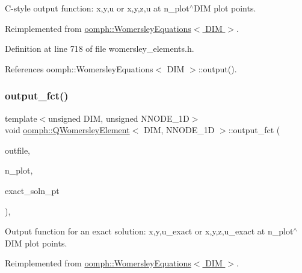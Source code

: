 C-\/style output function\+: x,y,u or x,y,z,u at n\+\_\+plot$^\wedge$\+D\+IM plot points. 



Reimplemented from \hyperlink{classoomph_1_1WomersleyEquations_ad5254560613d0c22280f15cc9cb42dc7}{oomph\+::\+Womersley\+Equations$<$ D\+I\+M $>$}.



Definition at line 718 of file womersley\+\_\+elements.\+h.



References oomph\+::\+Womersley\+Equations$<$ D\+I\+M $>$\+::output().

\mbox{\label{classoomph_1_1QWomersleyElement_ae15d32d03c1e64811cc29098c85d1e23}} 
\subsubsection{\texorpdfstring{output\+\_\+fct()}{output\_fct()}\hspace{0.1cm}{\footnotesize\ttfamily [1/2]}}
{\footnotesize\ttfamily template$<$unsigned D\+IM, unsigned N\+N\+O\+D\+E\+\_\+1D$>$ \\
void \hyperlink{classoomph_1_1QWomersleyElement}{oomph\+::\+Q\+Womersley\+Element}$<$ D\+IM, N\+N\+O\+D\+E\+\_\+1D $>$\+::output\+\_\+fct (\begin{DoxyParamCaption}\item[{std\+::ostream \&}]{outfile,  }\item[{const unsigned \&}]{n\+\_\+plot,  }\item[{\hyperlink{classoomph_1_1FiniteElement_a690fd33af26cc3e84f39bba6d5a85202}{Finite\+Element\+::\+Steady\+Exact\+Solution\+Fct\+Pt}}]{exact\+\_\+soln\+\_\+pt }\end{DoxyParamCaption})\hspace{0.3cm}{\ttfamily [inline]}, {\ttfamily [virtual]}}



Output function for an exact solution\+: x,y,u\+\_\+exact or x,y,z,u\+\_\+exact at n\+\_\+plot$^\wedge$\+D\+IM plot points. 



Reimplemented from \hyperlink{classoomph_1_1WomersleyEquations_aebc178cae7a5f50da1f76eed2ea3972d}{oomph\+::\+Womersley\+Equations$<$ D\+I\+M $>$}.



